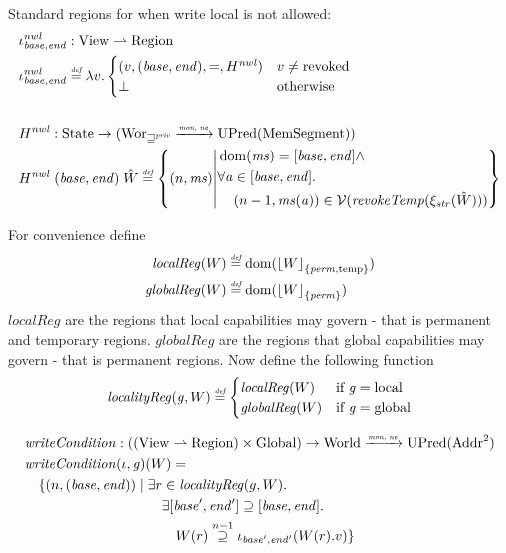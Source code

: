 \documentclass[a4paper]{article}
\DeclarePairedDelimiter\floor{\lfloor}{\rfloor}
\newcommand{\parfun}{\rightharpoonup}
\newcommand{\monnefun}{\xrightarrow{\textit{\tiny{mon, ne}}}}
\newcommand{\fun}{\rightarrow}
\newcommand{\defeq}{\stackrel{\textit{\tiny{def}}}{=}}
\newcommand{\nsupeq}[1][n]{\stackrel{\tiny{#1}}{\supseteq}}
\DeclareMathOperator{\dom}{dom}
\newcommand{\var}[1]{\mathit{#1}}
\newcommand{\hs}{\var{ms}}
\newcommand{\gl}{\var{g}}
\newcommand{\addr}{\var{a}}
\newcommand{\start}{\var{base}}
\newcommand{\addrend}{\var{end}}
\newcommand{\perm}{\var{perm}}
\newcommand{\plainfun}[2]{
  \ifthenelse{\equal{#2}{}}
             {\mathit{#1}}
             {\mathit{#1}(#2)}
}
\newcommand{\writeCond}[1]{\plainfun{writeCondition}{#1}}
\newcommand{\revokeTemp}[1]{\plainfun{revokeTemp}{#1}}
\newcommand{\erase}[2]{\floor*{#1}_{\{#2\}}}
\newcommand{\futurestr}{\mathbin{\sqsupseteq}^{\var{priv}}}
\newcommand{\asmType}{\plaindom{AsmType}}
\newcommand{\plaindom}[1]{\mathrm{#1}}
\newcommand{\Addrs}{\plaindom{Addr}}
\newcommand{\HeapSegments}{\plaindom{MemSegment}}
\newcommand{\Globals}{\plaindom{Global}}
\newcommand{\States}{\plaindom{State}}
\newcommand{\Regions}{\plaindom{Region}}
\newcommand{\Worlds}{\plaindom{World}}
\newcommand{\Wor}{\plaindom{Wor}}
\newcommand{\Worstr}{\Wor_{\futurestr}}
\newcommand{\xistr}{\xi_{\var{str}}}
\newcommand{\UPred}[1]{\plaindom{UPred}(#1)}
\newcommand{\Views}{\plaindom{View}}
\newcommand{\intr}[2]{\mathcal{#1}}
\newcommand{\valueintr}[1]{\intr{V}{#1}}
\newcommand{\stdvr}{\valueintr{\asmType}}
\newcommand{\npair}[2][n]{\left(#1,#2 \right)}
\newcommand{\plainperm}[1]{\mathrm{#1}}
\newcommand{\local}{\plainperm{local}}
\newcommand{\glob}{\plainperm{global}}
\newcommand{\localReg}{\var{localReg}}
\newcommand{\globalReg}{\var{globalReg}}
\newcommand{\plainview}[1]{\mathrm{#1}}
\newcommand{\temp}{\plainview{temp}}
\newcommand{\revoked}{\plainview{revoked}}
\begin{document}
Standard regions for when write local is not allowed:
\begin{align*}
  &\iota_{\start,\addrend}^{\var{nwl}} : \Views \parfun \Regions \\
  &\iota_{\start,\addrend}^{\var{nwl}} \defeq \lambda v \ldotp
    \begin{cases}
      (v,(\start,\addrend),=,H^{\var{nwl}}) & v \neq \revoked \\
      \bot & \text{otherwise}
\end{cases}
\\ \\
  &H^{\var{nwl}} : \States \fun (\Worstr \monnefun \UPred{\HeapSegments})\\
  &H^{\var{nwl}} \; (\start,\addrend) \;\hat{W} \defeq \left\{\npair{\hs} \middle|
    \begin{aligned}
      &\dom(\hs) = [\start,\addrend] \land \\
      &\forall \addr \in [\start,\addrend] \ldotp \\
      &\quad \npair[n-1]{\hs(\addr)} \in \stdvr(\revokeTemp{\xistr(\hat{W})})
    \end{aligned}
  \right\}
\end{align*}

For convenience define
\begin{align*}
  \localReg(W) & \defeq \dom(\erase{W}{\perm,\temp}) \\
  \globalReg(W) & \defeq \dom(\erase{W}{\perm})
\end{align*}
$\localReg$ are the regions that local capabilities may govern - that is permanent and temporary regions. $\globalReg$ are the regions that global capabilities may govern - that is permanent regions. Now define the following function
\[
  \var{localityReg}(\gl,W) \defeq 
  \begin{cases}
    \localReg(W) & \text{if } \gl = \local \\
    \globalReg(W) & \text{if } \gl = \glob
  \end{cases}
\]

\begin{align*}
    & \writeCond{} : ((\Views \rightharpoonup \Regions) \times \Globals) \fun \Worlds \monnefun \UPred{\Addrs^2}  \\
    & \writeCond{}(\iota,\gl)(W) =  \\
    & \quad \begin{aligned}[t]
              \{ \npair{(\start,\addrend)} \mid & \;\exists r \in \var{localityReg}(g,W) \ldotp \\
              & \;\quad \exists [\start',\addrend'] \supseteq [\start,\addrend] \ldotp \\
              & \;\qquad W(r)\nsupeq[n-1] \iota_{\start',\addrend'}(W(r).v) \}
            \end{aligned}
\end{align*}
\end{document}
